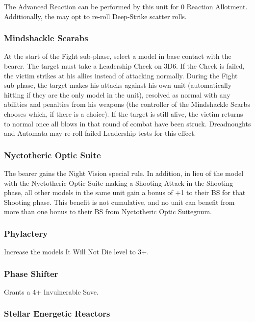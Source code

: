 The  Advanced Reaction can be performed by this unit for 0 Reaction Allotment. Additionally, the may opt to re-roll Deep-Strike scatter rolls.

\subsubsection{Mindshackle Scarabs} \label{Mindshackle Scarabs}

At the start of the Fight sub-phase, select a model in base contact with the bearer. The target must take a Leadership Check on 3D6. If the Check is failed, the victim strikes at his allies instead of attacking normally. During the Fight sub-phase, the target makes his attacks against his own unit (automatically hitting if they are the only model in the unit), resolved as normal with any abilities and penalties from his weapons (the controller of the Mindshackle Scarbs chooses which, if there is a choice). If the target is still alive, the victim returns to normal once all blows in that round of combat have been struck. Dreadnoughts and Automata may re-roll failed Leadership tests for this effect.

\subsubsection{Nyctotheric Optic Suite} \label{Nyctotheric Optic Suite}

The bearer gains the Night Vision special rule. In addition, in lieu of the model with the Nyctotheric Optic Suite making a Shooting Attack in the Shooting phase, all other models in the same unit gain a bonus of +1 to their BS for that Shooting phase. This benefit is not cumulative, and no unit can benefit from more than one bonus to their BS from Nyctotheric Optic Suitegnum.

\subsubsection{Phylactery} \label{Phylactery}

Increase the models It Will Not Die level to 3+.

\subsubsection{Phase Shifter} \label{Phase Shifter}

Grants a 4+ Invulnerable Save.

\subsubsection{Stellar Energetic Reactors} \label{Stellar Energetic Reactors}

